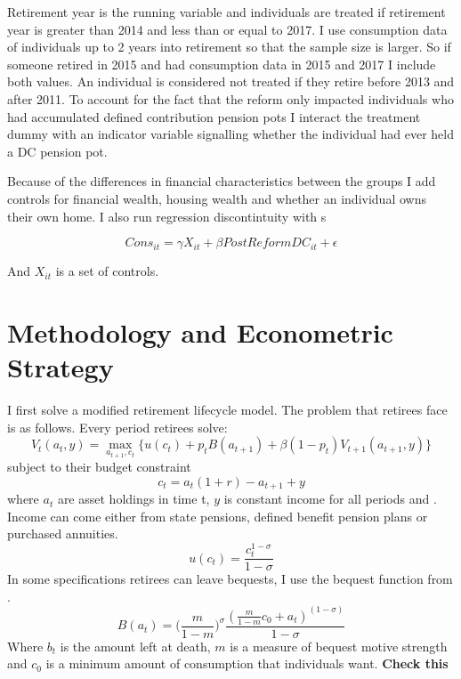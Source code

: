 \documentclass[12pt]{article}
\begin{document}
Retirement year is the running variable and individuals are treated if retirement year is greater than 2014 and less than
or equal to 2017. I use consumption data of individuals up to 2 years into retirement so that the sample size is larger.
So if someone retired in 2015 and had consumption data in 2015 and 2017 I include both values. An individual is considered
not treated if they retire before 2013 and after 2011.  To account for the fact
that the reform only impacted individuals who had accumulated defined contribution pension pots I interact the treatment dummy with
an indicator variable signalling whether the individual had ever held a DC pension pot.

Because of the differences in financial characteristics between the groups I add controls for financial wealth, housing wealth
and whether an individual owns their own home. I also run regression discontintuity with s

\begin{equation*}
  Cons_{it} =  \gamma X_{it} + \beta PostReformDC_{it} + \epsilon
\end{equation*}

And $X_{it}$ is a set of controls.





\section{Methodology and Econometric Strategy}

I first solve a modified retirement lifecycle model. The problem that retirees face is as follows.
Every period retirees solve:
\begin{equation*}
  V_{t}(a_{t}, y) = \underset{a_{t+1}, c_{t}}{\max} \{ u(c_{t}) + p_{t}B(a_{t+1}) + \beta(1-p_{t})V_{t+1}(a_{t+1}, y) \}
\end{equation*}
subject to their budget constraint
\begin{equation*}
  c_{t} =a_{
  t}(1 +r) -  a_{t+1} + y
\end{equation*}
where $a_{t}$ are asset holdings in time t, $y$ is constant income for all periods and . Income can come either
from state pensions, defined benefit pension plans or purchased annuities.
\begin{equation*}
  u(c_{t}) = \frac{c_{t}^{1 - \sigma}}{1 - \sigma}
\end{equation*} In some specifications retirees can leave bequests, I use the bequest function from
\cite{lockwood_red_2012}.
\begin{equation*}
  B(a_{t}) = \bigl( \frac{m}{1 - m} \bigr)^{\sigma}  \frac{(\frac{m}{1 - m}c_{0} + a_{t})^{(1 - \sigma)}}{1 - \sigma}
\end{equation*}
Where $b_{t}$ is the amount left at death, $m$ is a measure of bequest motive strength and $c_{0}$ is
a minimum amount of consumption that individuals want. \textbf{Check this}
\end{document}

